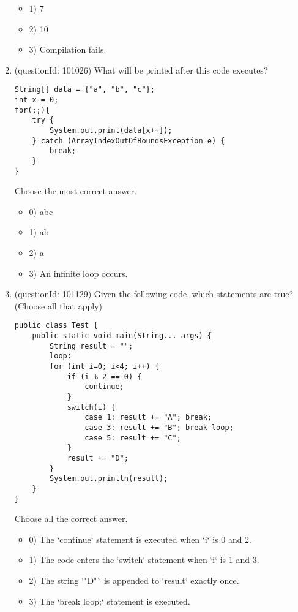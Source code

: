 \documentclass[12pt]{article}
\begin{document}
\begin{enumerate}[label=(\arabic*)]
\begin{itemize}
\item 1) 7

\item 2) 10

\item 3) Compilation fails.

\end{itemize}
\item (questionId: 101026) What will be printed after this code executes?\n\begin{verbatim}
String[] data = {"a", "b", "c"};
int x = 0;
for(;;){
    try {
        System.out.print(data[x++]);
    } catch (ArrayIndexOutOfBoundsException e) {
        break;
    }
}
\end{verbatim}
Choose the most correct answer. 
\begin{itemize}
\item 0) abc

\item 1) ab

\item 2) a

\item 3) An infinite loop occurs.

\end{itemize}
\item (questionId: 101129) Given the following code, which statements are true? (Choose all that apply)\n\begin{verbatim}
public class Test {
    public static void main(String... args) {
        String result = "";
        loop:
        for (int i=0; i<4; i++) {
            if (i % 2 == 0) {
                continue;
            }
            switch(i) {
                case 1: result += "A"; break;
                case 3: result += "B"; break loop;
                case 5: result += "C";
            }
            result += "D";
        }
        System.out.println(result);
    }
}
\end{verbatim}
Choose all the correct answer.\begin{itemize}
\item 0) The `continue` statement is executed when `i` is 0 and 2.

\item 1) The code enters the `switch` statement when `i` is 1 and 3.

\item 2) The string `"D"` is appended to `result` exactly once.

\item 3) The `break loop;` statement is executed.


\end{itemize}
\end{enumerate}
\end{document}
